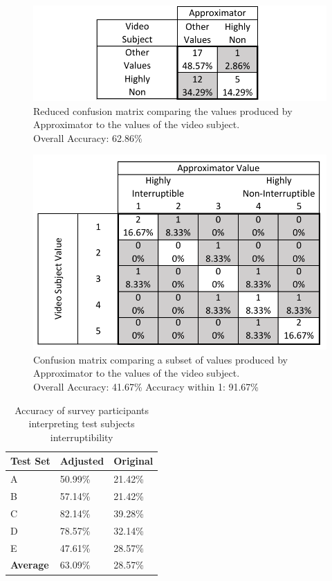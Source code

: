 \documentclass{sigchi}
\begin{document}
\begin{figure}[h]
  \centering
  \includegraphics[width=\columnwidth]{figures/VideoToApproximatorReducedConfusionMatrix.pdf}
  \caption{Reduced confusion matrix comparing the values produced by Approximator to the values of the video subject. \\Overall Accuracy: 62.86\%}
  \label{fig:reduced_video_to_approximator_matrix}
\end{figure}

\begin{figure}[h]
  \centering
  \includegraphics[width=\columnwidth]{figures/VideoToApproximatorConfusionMatrix(AndersValues).pdf}
  \caption{Confusion matrix comparing a subset of values produced by Approximator to the values of the video subject. \\Overall Accuracy: 41.67\% Accuracy within 1: 91.67\%}
  \label{fig:subset_video_to_approximator_matrix}
\end{figure}

\begin{table}[h]
  \centering
  \begin{tabular}{@{}lll@{}}
    \toprule
    \textbf{Test Set}     & Adjusted & Original \\ \midrule
    A       & 50.99\%    & 21.42\%    \\
    B       & 57.14\%    & 21.42\%    \\
    C       & 82.14\%    & 39.28\%    \\
    D       & 78.57\%    & 32.14\%    \\
    E       & 47.61\%    & 28.57\%    \\ \midrule
    \textbf{Average} & 63.09\%    & 28.57\%    \\ \bottomrule
  \end{tabular}
  \caption{Accuracy of survey participants interpreting test subjects interruptibility}
  \label{tab:survey_accuracy}
\end{table}
\end{document}
